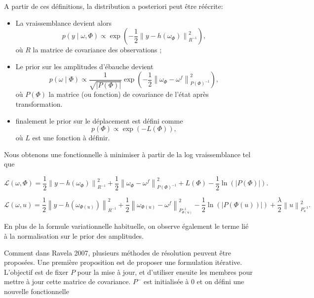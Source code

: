 \documentclass{article}
\newcommand{\norm}[1]{\left\lVert #1 \right\rVert}
\begin{document}
A partir de ces définitions, la distribution a posteriori peut être réécrite:

\begin{itemize}
    \item La vraissemblance devient alors
          \begin{equation*}
              p(y \mid \omega, \Phi) \propto \exp\left(-\frac{1}{2}\norm{y - h(\omega_\Phi)}^2_{R^{-1}}\right),
          \end{equation*}où $R$ la matrice de covariance des observations ;
    \item Le prior sur les amplitudes d'ébauche devient
          \begin{equation*}
              p(\omega \mid \Phi) \propto \frac{1}{\sqrt{|P(\Phi)|}} \exp\left(-\frac{1}{2} \norm{\omega_{\Phi} - \omega^f}^2_{P(\Phi)^{-1}}\right),
          \end{equation*}où $P(\Phi)$ la matrice (ou fonction) de covariance de l'état après transformation.
    \item finalement le prior sur le déplacement est défini comme
          \begin{equation*}
              p(\Phi) \propto \exp\left(-L(\Phi)\right),
          \end{equation*}où $L$ est une fonction à définir.
\end{itemize}

Nous obtenons une fonctionnelle à minimiser à partir de la log vraissemblance tel que

\begin{equation*}
    \mathcal L(\omega, \Phi) = \frac{1}{2}\norm{y - h(\omega_\Phi)}^2_{R^{-1}} + \frac{1}{2} \norm{\omega_{\Phi} - \omega^f}^2_{P(\Phi)^{-1}} + L(\Phi) - \frac{1}{2} \ln(|P(\Phi)|).
\end{equation*}

\begin{equation*}
    \mathcal L(\omega, u) = \frac{1}{2}\norm{y - h(\omega_{\Phi(u)})}^2_{R^{-1}} + \frac{1}{2} \norm{\omega_{\Phi(u)} - \omega^f}^2_{P_{\Phi(u)}^{-1}} - \frac{1}{2} \ln(|P(\Phi(u))|) + \frac\lambda 2 \norm{u}^2_{P_u^{-1}} .
\end{equation*}

En plus de la formule variationnelle habituelle, on observe également le terme lié à la normalisation sur le prior des amplitudes.

Comment dans Ravela 2007, plusieurs méthodes de résolution peuvent être proposées. Une première proposition est de proposer une formulation itérative. L'objectif est de fixer $P$ pour la mise à jour, et d'utiliser ensuite les membres pour mettre à jour cette matrice de covariance. $P^-$ est initialisée à 0 et on défini une nouvelle fonctionnelle
\end{document}
